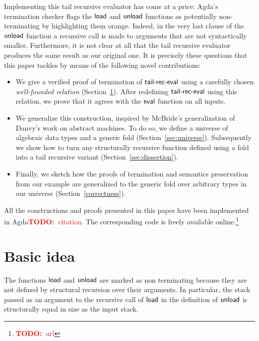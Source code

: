 \documentclass[sigplan,10pt,review]{acmart}
\newcommand\todo[1]{\textcolor{red}{\textbf{TODO:~}#1}}
\newcommand{\AF}{\AgdaFunction}
\newcommand{\nonterm}[1]{\hspace*{-0.1cm}\colorbox{orange!25}{#1}}
\begin{document}
Implementing this tail recursive evaluator has come at a price: Agda's
termination checker flags the \ensuremath{\AF{load}} and \ensuremath{\AF{unload}} functions as
potentially non-terminating by highlighting them
\nonterm{orange}. Indeed, in the very last clause of the \ensuremath{\AF{unload}}
function a recursive call is made to arguments that are not
syntactically smaller. Furthermore, it is not clear at all that the
tail recursive evaluator produces the same result as our original
one. It is precisely these questions that this paper tackles by
means of the following novel contributions:

\begin{itemize}
\item We give a verified proof of termination of \ensuremath{\AF{tail\text{-}rec\text{-}eval}} using
  a carefully chosen \emph{well-founded relation}
  (Section~\ref{sec:basics}). After redefining \ensuremath{\AF{tail\text{-}rec\text{-}eval}} using
  this relation, we prove that it agrees with the \ensuremath{\AF{eval}} function on
  all inputs.
\item We generalize this construction, inspired by McBride's
  generalization of Danvy's work on abstract machines. To do so, we
  define a universe of algebraic data types and a generic fold
  (Section~\ref{sec:universe}). Subsequently we show how to turn any
  structurally recursive function defined using a fold into a tail
  recursive variant (Section~\ref{sec:dissection}). 
\item Finally, we sketch how the proofs of termination and semantics
  preservation from our example are generalized to the generic fold
  over arbitrary types in our universe (Section~\ref{correctness}).
\end{itemize}

All the constructions and proofs presented in this paper have been
implemented in Agda\todo{citation}. The corresponding code is freely
available online.\footnote{\todo{url}}

\section{Basic idea}
\label{sec:basics}
The functions \ensuremath{\AF{load}} and \ensuremath{\AF{unload}} are marked as non terminating
because they are not defined by structural recursion over their
arguments. In particular, the stack passed as an argument to the
recursive call of \ensuremath{\AF{load}} in the definition of \ensuremath{\AF{unload}} is structurally
equal in size as the input stack.
\end{document}
